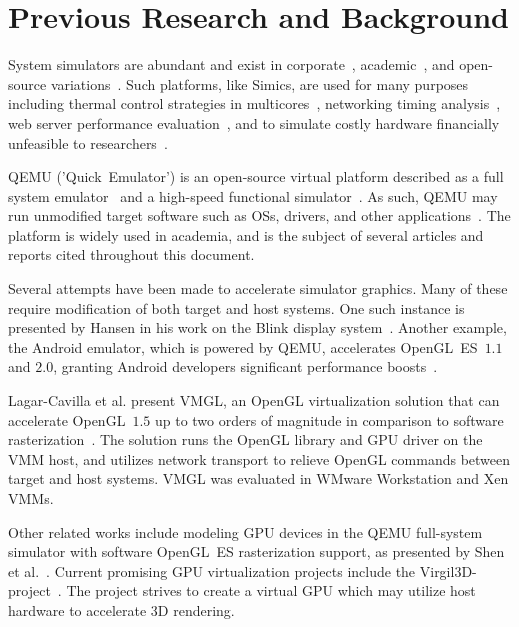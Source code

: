 
\section{Previous Research and Background}
\label{sec:previousresearch}
System simulators are abundant and exist in corporate~, academic~, and open-source variations~.
Such platforms, like Simics, are used for many purposes including thermal control strategies in multicores~, networking timing analysis~, web server performance evaluation~, and to simulate costly hardware financially unfeasible to researchers~.

QEMU ('Quick~Emulator') is an open-source virtual platform described as a full system emulator~ and a high-speed functional simulator~.
As such, QEMU may run unmodified target software such as OSs, drivers, and other applications~.
The platform is widely used in academia, and is the subject of several articles and reports cited throughout this document.

Several attempts have been made to accelerate simulator graphics.
Many of these require modification of both target and host systems.
One such instance is presented by Hansen in his work on the Blink display system~.
Another example, the Android emulator, which is powered by QEMU, accelerates OpenGL~ES~$1.1$ and $2.0$, granting Android developers significant performance boosts~.

Lagar-Cavilla et al. present VMGL, an OpenGL virtualization solution that can accelerate OpenGL~$1.5$ up to two orders of magnitude in comparison to software rasterization~.
The solution runs the OpenGL library and GPU driver on the VMM host, and utilizes network transport to relieve OpenGL commands between target and host systems.
VMGL was evaluated in WMware Workstation and Xen VMMs.

Other related works include modeling GPU devices in the QEMU full-system simulator with software OpenGL~ES rasterization support, as presented by Shen et al.~.
Current promising GPU virtualization projects include the Virgil3D-project~.
The project strives to create a virtual GPU which may utilize host hardware to accelerate 3D rendering.

